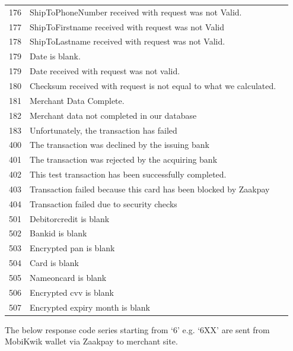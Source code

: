 \documentclass{article}
\newcommand{\xmark}{\ding{55}}
\begin{document}
\begin{longtable}{||c|p{12.5cm}||c|}
176 &ShipToPhoneNumber received with request was not Valid.& \textcolor{red} {\xmark} \\
177 &ShipToFirstname received with request was not Valid& \textcolor{red} {\xmark} \\
178 &ShipToLastname received with request was not Valid.& \textcolor{red} {\xmark} \\
179 &Date is blank.& \textcolor{red} {\xmark} \\
179 &Date received with request was not valid.& \textcolor{red} {\xmark} \\
180 &Checksum received with request is not equal to what we calculated.& \textcolor{red} {\xmark} \\
181 & Merchant Data Complete.& \textcolor{red} {\xmark} \\
182 &Merchant data not completed in our database& \textcolor{red} {\xmark} \\
183 &Unfortunately, the transaction has failed& \textcolor{red} {\xmark} \\
400 &The transaction was declined by the issuing bank& \textcolor{red} {\xmark} \\
401 &The transaction was rejected by the acquiring bank& \textcolor{red} {\xmark} \\
402 &This test transaction has been successfully completed.& \textcolor{red} {\xmark} \\
403 &Transaction failed because this card has been blocked by Zaakpay& \textcolor{red} {\xmark} \\
404 &Transaction failed due to security checks& \textcolor{red} {\xmark} \\
501 &Debitorcredit is blank& \textcolor{red} {\xmark} \\
502 &Bankid is blank& \textcolor{red} {\xmark} \\
503 &Encrypted pan is blank& \textcolor{red} {\xmark} \\
504 &Card is blank& \textcolor{red} {\xmark} \\
505 &Nameoncard is blank& \textcolor{red} {\xmark} \\
506 &Encrypted cvv is blank& \textcolor{red} {\xmark} \\
507 &Encrypted expiry month is blank& \textcolor{red} {\xmark} \\\end{longtable}
\newpage
The below response code series starting from ‘6’ e.g. ‘6XX’ are sent from MobiKwik wallet via Zaakpay to merchant site. \\
\end{document}
